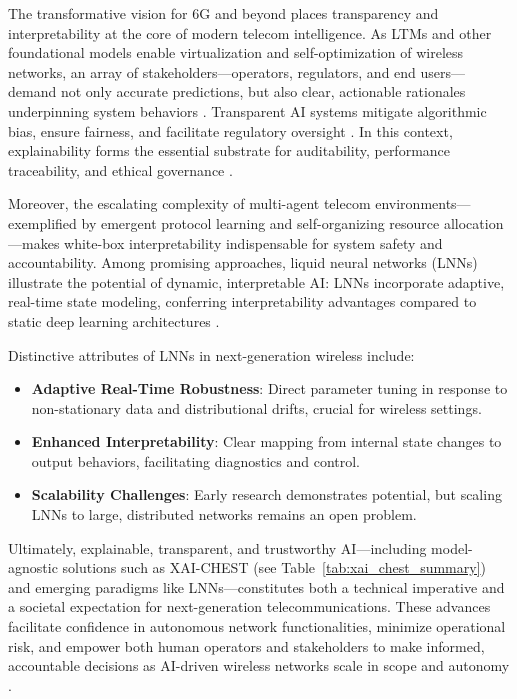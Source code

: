 The transformative vision for 6G and beyond places transparency and interpretability at the core of modern telecom intelligence. As LTMs and other foundational models enable virtualization and self-optimization of wireless networks, an array of stakeholders—operators, regulators, and end users—demand not only accurate predictions, but also clear, actionable rationales underpinning system behaviors \cite{ref41}. Transparent AI systems mitigate algorithmic bias, ensure fairness, and facilitate regulatory oversight \cite{ref7}. In this context, explainability forms the essential substrate for auditability, performance traceability, and ethical governance \cite{ref7}\cite{ref8}\cite{ref9}\cite{ref26}\cite{ref33}\cite{ref35}\cite{ref38}\cite{ref41}.

Moreover, the escalating complexity of multi-agent telecom environments—exemplified by emergent protocol learning and self-organizing resource allocation—makes white-box interpretability indispensable for system safety and accountability. Among promising approaches, liquid neural networks (LNNs) illustrate the potential of dynamic, interpretable AI: LNNs incorporate adaptive, real-time state modeling, conferring interpretability advantages compared to static deep learning architectures \cite{ref35}.

Distinctive attributes of LNNs in next-generation wireless include:

\begin{itemize}
    \item \textbf{Adaptive Real-Time Robustness}: Direct parameter tuning in response to non-stationary data and distributional drifts, crucial for wireless settings.
    \item \textbf{Enhanced Interpretability}: Clear mapping from internal state changes to output behaviors, facilitating diagnostics and control.
    \item \textbf{Scalability Challenges}: Early research demonstrates potential, but scaling LNNs to large, distributed networks remains an open problem.
\end{itemize}

Ultimately, explainable, transparent, and trustworthy AI—including model-agnostic solutions such as XAI-CHEST (see Table~\ref{tab:xai_chest_summary}) and emerging paradigms like LNNs—constitutes both a technical imperative and a societal expectation for next-generation telecommunications. These advances facilitate confidence in autonomous network functionalities, minimize operational risk, and empower both human operators and stakeholders to make informed, accountable decisions as AI-driven wireless networks scale in scope and autonomy \cite{ref41}.

